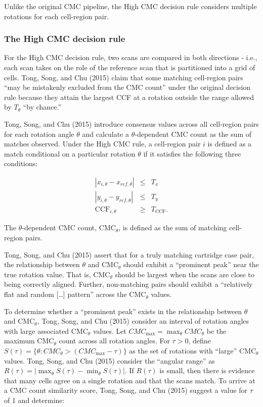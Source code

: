 Unlike the original CMC pipeline, the High CMC decision rule considers multiple rotations for each cell-region pair.

\hypertarget{highCMCMethod}{%
\subsubsection{The High CMC decision rule}\label{highCMCMethod}}

For the High CMC decision rule, two scans are compared in both directions - i.e., each scan takes on the role of the reference scan that is partitioned into a grid of cells.
Tong, Song, and Chu (2015) claim that some matching cell-region pairs ``may be mistakenly excluded from the CMC count'' under the original decision rule because they attain the largest CCF at a rotation outside the range allowed by \(T_\theta\) ``by chance.''

Tong, Song, and Chu (2015) introduce consensus values across all cell-region pairs for each rotation angle \(\theta\) and calculate a \(\theta\)-dependent CMC count as the sum of matches observed.
Under the High CMC rule, a cell-region pair \(i\) is defined as a match conditional on a particular rotation \(\theta\) if it satisfies the following three conditions:

\begin{eqnarray}
|x_{i,\theta} - x_{ref,\theta}| &\leq& T_x \\ \nonumber
|y_{i,\theta} - y_{ref,\theta}| &\leq& T_y \\ \nonumber
\text{CCF}_{i,\theta} &\geq& T_{\text{CCF}}.
\label{eq:highCMC}
\end{eqnarray}

The \(\theta\)-dependent CMC count, CMC\(_\theta\), is defined as the sum of matching cell-region pairs.

Tong, Song, and Chu (2015) assert that for a truly matching cartridge case pair, the relationship between \(\theta\) and CMC\(_\theta\) should exhibit a ``prominent peak'' near the true rotation value.
That is, CMC\(_{\theta}\) should be largest when the scans are close to being correctly aligned.
Further, non-matching pairs should exhibit a ``relatively flat and random {[}\ldots{]} pattern'' across the CMC\(_{\theta}\) values.

To determine whether a ``prominent peak'' exists in the relationship between \(\theta\) and CMC\(_\theta\), Tong, Song, and Chu (2015) consider an interval of rotation angles with large associated CMC\(_\theta\) values.
Let \(CMC_{\text{max}} = \max_{\theta} CMC_{\theta}\) be the maximum CMC\(_\theta\) count across all rotation angles.
For \(\tau > 0\), define \(S(\tau) = \{\theta : CMC_\theta > (CMC_{\max} - \tau)\}\) as the set of rotations with ``large'' CMC\(_\theta\) values.
Tong, Song, and Chu (2015) consider the ``angular range'' as \(R(\tau) = |\max_{\theta} S(\tau) - \min_\theta S(\tau)|\).
If \(R(\tau)\) is small, then there is evidence that many cells agree on a single rotation and that the scans match.
To arrive at a CMC count similarity score, Tong, Song, and Chu (2015) suggest a value for \(\tau\) of 1 and determine:

